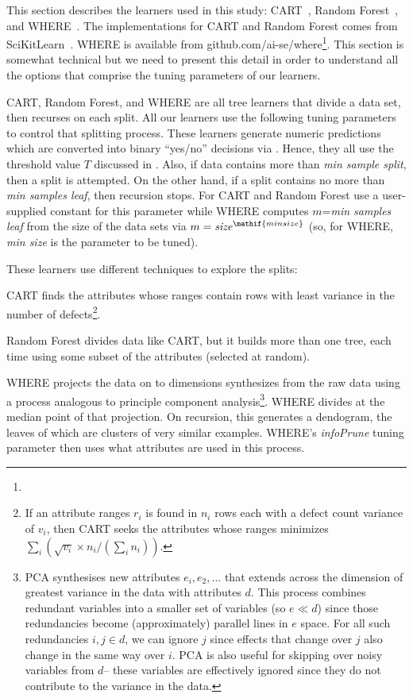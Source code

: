 This section describes the learners used in this study: CART~\cite{brieman00}, Random Forest~\cite{breiman84}, 
and WHERE~\cite{menzies2013local}. 
The implementations
for CART and Random Forest comes from 
SciKitLearn~\cite{scikit-learn}.
WHERE is available from
github.com/ai-se/where\footnote{}.
This section is somewhat technical but we need
to present this detail in order to understand all the options that comprise the tuning 
parameters of our learners.

CART, Random Forest, and WHERE are all  tree learners that divide a data set, then recurses
on each split.
All our learners use the following tuning parameters to control that splitting process.
These learners
generate numeric predictions which are converted
into binary ``yes/no'' decisions via . Hence, they all use the threshold value $T$ discussed in .
Also, if data contains more than {\em min sample split}, then a split is attempted.
On the other hand, if a split contains no more than {\em min samples leaf}, then recursion stops. For CART and Random Forest use a 
user-supplied constant for this parameter while
WHERE computes $m$={\em min samples leaf} from the size of the data
sets via  $m=\mathit{size}^\mathif{min size}$ (so, for WHERE,
{\em min size} is the parameter to be tuned).

These learners use different techniques to explore the splits:
\bi
\item
CART finds the attributes whose ranges contain rows with least variance in the number
of defects\footnote{If an attribute ranges $r_i$ is found in 
$n_i$ rows each with a  defect count variance of $v_i$, then CART seeks the attributes
whose ranges minimizes $\sum_i \left(\sqrt{v_i}\times n_i/(\sum_i n_i)\right)$.}.
\item
Random Forest    divides data like CART,
but it builds more than one tree, each time using some subset of
the attributes (selected at random). 
\item
WHERE projects the data on to dimensions synthesizes from the raw data using
a process analogous to principle component analysis\footnote{
PCA  synthesises  new
attributes $e_i, e_2,...$
that extends across the dimension of greatest  variance in the data  with attributes $d$.  
This process  combines
redundant  variables into a smaller set of variables  (so $e \ll d$) since those
redundancies become (approximately) parallel lines
in $e$ space. For all such redundancies \mbox{$i,j \in d$}, we 
can ignore $j$ 
since effects that change over $j$ also
change in the same way over $i$.
PCA is also useful for skipping over noisy variables from $d$-- these
variables are effectively ignored since    they  do not contribute to the variance in the data.}.
WHERE   divides  at the median point of that projection. On recursion,
this generates a dendogram, the leaves of which are clusters of  very similar examples.
\ei
WHERE's {\em infoPrune} tuning parameter then uses  what attributes are used in this process.

